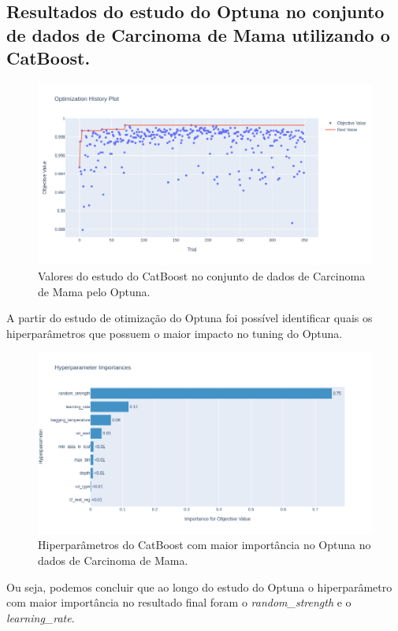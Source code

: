 \subsection{Resultados do estudo do Optuna no conjunto de dados de Carcinoma de Mama utilizando o CatBoost.}
\begin{figure}[H]
 \caption{Valores do estudo do CatBoost no conjunto de dados de Carcinoma de Mama pelo Optuna.}
 \label{fig:op:cancer:trials:cat}
 \centering
 \includegraphics[scale=0.4]{images/optuna_catboost_cancer.png}
\end{figure}
A partir do estudo de otimização do Optuna foi possível identificar quais os hiperparâmetros que possuem o maior impacto no tuning do Optuna.
\begin{figure}[H]
 \caption{Hiperparâmetros do CatBoost com maior importância no Optuna no dados de Carcinoma de Mama.}
 \label{fig:op:cancer:impo:cat}
 \centering
 \includegraphics[scale=0.4]{images/optuna_catboost_imporatnce_cancer.png}
\end{figure}
Ou seja, podemos concluir que ao longo do estudo do Optuna o hiperparâmetro com maior importância no resultado final foram o \textit{random\_strength} e o \textit{learning\_rate}.

